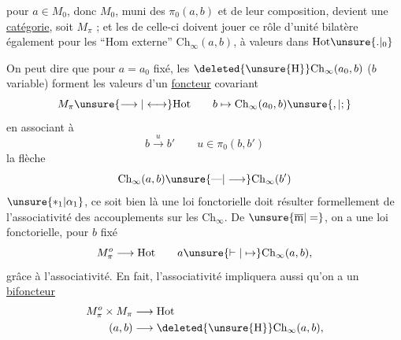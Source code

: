 pour  $a\in M_0$, donc $M_0$, muni des $\pi_0(a,b)$ et de leur composition, devient une \uline{catégorie},  soit $M_{\pi}$ ; et les   de celle-ci doivent jouer ce rôle d'unité bilatère également pour les ``Hom externe'' $\mathrm{Ch}_{\infty}(a,b)$, à valeurs dans $\mathrm{Hot}\unsure{. |{}_{0}}$

On peut dire que pour $a=a_0$ fixé, les  $\deleted{\unsure{\mathrm H}}\mathrm{Ch}_{\infty}(a_0,b)$ ($b$ variable) forment les valeurs d'un \uline{foncteur} covariant
\[
M_{\pi}\unsure{\longrightarrow|\longleftrightarrow}\mathrm{Hot}\qquad b\mapsto\mathrm{Ch}_{\infty}(a_0,b)\unsure{,|;}
\]
 en associant à
\[
b\xrightarrow{u}b'\qquad u\in\pi_0(b,b')
\]
la flèche
\[
\mathrm{Ch}_{\infty}(a,b)\unsure{\text{---}|\longrightarrow}\mathrm{Ch}_{\infty}(b')
\]
 $\unsure{*_1|\alpha_1}$,  ce soit bien là une loi fonctorielle doit résulter formellement de l'associativité des accouplements sur les $\mathrm{Ch}_{\infty}$. De $\unsure{\overline{\mathrm m}|=}$, on a une loi fonctorielle, pour $b$ fixé
\[
M_{\pi}^{o}\longrightarrow\mathrm{Hot}\qquad a\unsure{\vdash|\mapsto}\mathrm{Ch}_{\infty}(a,b),
\]
grâce à l'associativité. En fait, l'associativité impliquera aussi qu'on a un \uline{bifoncteur}
\[
\begin{aligned}
M_{\pi}^{o}\times M_{\pi}&\longrightarrow\mathrm{Hot}\\
(a,b)&\longrightarrow\deleted{\unsure{\mathrm H}}\mathrm{Ch}_{\infty}(a,b),
\end{aligned}
\]

